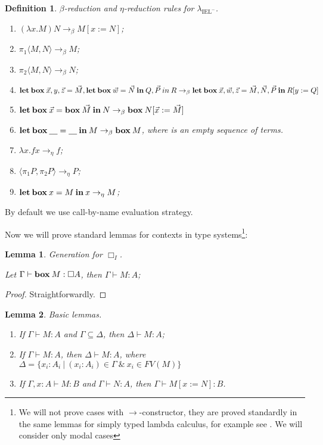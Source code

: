 \documentclass[a4paper]{article}
\newtheorem{lemma}{Lemma}
\newtheorem{defin}{Definition}
\begin{document}
  \begin{defin} $\beta$-reduction and $\eta$-reduction rules for $\lambda_{\text{IEL}^{-}}$.

\begin{enumerate}
  \item $(\lambda x. M) N \rightarrow_{\beta} M [x := N]$;
  \item $\pi_1 \langle M, N \rangle \rightarrow_{\beta} M$;
  \item $\pi_2 \langle M, N \rangle \rightarrow_{\beta} N$;
  \item ${\bf let \: box \:} \vec{x}, y, \vec{z} = \vec{M}, {\bf let \: box \: } \vec{w} = \vec{N} {\: \bf in \: } Q, \vec{P} {\: in \:} R \rightarrow_{\beta} \\
  {\bf let \: box \:} \vec{x}, \vec{w}, \vec{z} = \vec{M}, \vec{N}, \vec{P} {\: \bf in \: } R [y := Q]$
  \item ${\bf let \: box \:} \vec{x} = {\bf box \:} \vec{M} {\: \bf in \:} N \rightarrow_{\beta} {\bf box \:} N [\vec{x} := \vec{M}]$
  \item ${\bf let \: box \:} \underline{\quad} = \underline{\quad} {\: \bf in \:} M \rightarrow_{\beta} {\bf box \:} M$, where \underline{\quad} is an empty sequence of terms.
  \item $\lambda x. f x \rightarrow_{\eta} f$;
  \item $\langle \pi_1 P, \pi_2 P \rangle \rightarrow_{\eta} P$;
  \item ${\bf let \: box \:} x = M {\: \bf in \: } x \rightarrow_{\eta} M$;
\end{enumerate}
  \end{defin}

By default we use call-by-name evaluation strategy.

Now we will prove standard lemmas for contexts in type systems\footnote{We will not prove cases with
$\to$-constructor, they are proved standardly in the same lemmas for simply typed lambda calculus, for
example see \cite{Neder} \cite{Morten}. We will consider only modal cases}:

\begin{lemma} Generation for $\Box_I$.

  Let $\Gamma \vdash {\bf box \:} M : \Box A$, then $\Gamma \vdash M : A$;
\end{lemma}

\begin{proof}
  Straightforwardly.
\end{proof}

\begin{lemma} Basic lemmas.

\begin{enumerate}
  \item If $\Gamma \vdash M : A$ and $\Gamma \subseteq \Delta$, then $\Delta \vdash M : A$;
  \item If $\Gamma \vdash M : A$, then $\Delta \vdash M : A$, where $\Delta = \{ x_i : A_i \: | \: (x_i : A_i) \in \Gamma \: \& \: x_i \in FV(M) \}$
  \item If $\Gamma, x : A \vdash M : B$ and $\Gamma \vdash N : A$, then $\Gamma \vdash M [x := N] : B$.
\end{enumerate}
\end{lemma}
\end{document}
